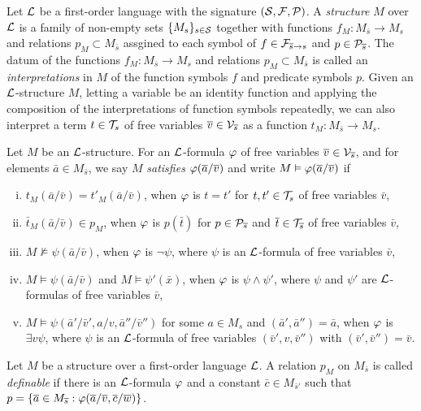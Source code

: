\documentclass{../../large}
\begin{document}
\begin{prb}
Let $\mathcal{L}$ be a first-order language with the signature $(\mathcal{S},\mathcal{F},\mathcal{P})$.
A \emph{structure} $M$ over $\mathcal{L}$ is a family of non-empty sets $\{M_s\}_{s\in\mathcal{S}}$ together with functions $f_M:M_{\bar s}\to M_s$ and relations $p_M\subset M_{\bar s}$ assgined to each symbol of $f\in\mathcal{F}_{\overline s\to s}$ and $p\in\mathcal{P}_{\overline s}$.
The datum of the functions $f_M:M_{\bar s}\to M_s$ and relations $p_M\subset M_{\bar s}$ is called an \emph{interpretations} in $M$ of the function symbols $f$ and predicate symbols $p$.
Given an $\mathcal{L}$-structure $M$, letting a variable be an identity function and applying the composition of the interpretations of function symbols repeatedly, we can also interpret a term $t\in\mathcal{T}_s$ of free variables $\overline v\in\mathcal{V}_{\overline s}$ as a function $t_M:M_{\bar s}\to M_s$.


Let $M$ be an $\mathcal{L}$-structure.
For an $\mathcal{L}$-formula $\varphi$ of free variables $\overline v\in\mathcal{V}_{\overline s}$, and for elements $\bar a\in M_{\bar s}$, we say $M$ \emph{satisfies} $\varphi(\overline a/\overline v)$ and write $M\vDash\varphi(\overline a/\overline v)$ if
\begin{enumerate}[(i)]
\item $t_M(\bar a/\bar v)=t'_M(\bar a/\bar v)$, when $\varphi$ is $t=t'$ for $t,t'\in\mathcal{T}_s$ of free variables $\bar v$,
\item $\bar t_M(\bar a/\bar v)\in p_M$, when $\varphi$ is $p(\bar t)$ for $p\in\mathcal{P}_{\overline s}$ and $\overline t\in\mathcal{T}_{\overline s}$ of free variables $\bar v$,
\item $M\not\vDash\psi(\bar a/\bar v)$, when $\varphi$ is $\neg\psi$, where $\psi$ is an $\mathcal{L}$-formula of free variables $\bar v$,
\item $M\vDash\psi(\bar a/\bar v)$ and $M\vDash\psi'(\bar x)$, when $\varphi$ is $\psi\wedge\psi'$, where $\psi$ and $\psi'$ are $\mathcal{L}$-formulas of free variables $\bar v$,
\item $M\vDash\psi(\bar a'/\bar v',a/v,\bar a''/\bar v'')$ for some $a\in M_s$ and $(\bar a',\bar a'')=\bar a$, when $\varphi$ is $\exists v\psi$, where $\psi$ is an $\mathcal{L}$-formula of free variables $(\bar v',v,\bar v'')$ with $(\bar v',\bar v'')=\bar v$.
\end{enumerate}
\end{prb}

\begin{prb}
\end{prb}



Let $M$ be a structure over a first-order language $\mathcal{L}$.
A relation $p_M$ on $M_{\bar s}$ is called \emph{definable} if there is an $\mathcal{L}$-formula $\varphi$ and a constant $\bar c\in M_{\bar s'}$ such that $p=\{\overline a\in M_{\overline s}:\varphi(\overline a/\overline v,\overline c/\overline w)\}$.
\end{document}
